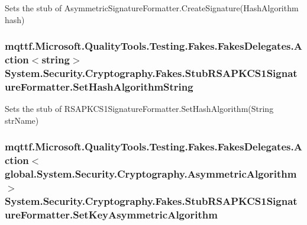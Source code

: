 Sets the stub of Asymmetric\-Signature\-Formatter.\-Create\-Signature(\-Hash\-Algorithm hash)

\hypertarget{class_system_1_1_security_1_1_cryptography_1_1_fakes_1_1_stub_r_s_a_p_k_c_s1_signature_formatter_a7e17f3c4cb25bad35778ced0bef583e9}{
\subsubsection[{Set\-Hash\-Algorithm\-String}]{\setlength{\rightskip}{0pt plus 5cm}mqttf.\-Microsoft.\-Quality\-Tools.\-Testing.\-Fakes.\-Fakes\-Delegates.\-Action$<$string$>$ System.\-Security.\-Cryptography.\-Fakes.\-Stub\-R\-S\-A\-P\-K\-C\-S1\-Signature\-Formatter.\-Set\-Hash\-Algorithm\-String}}\label{class_system_1_1_security_1_1_cryptography_1_1_fakes_1_1_stub_r_s_a_p_k_c_s1_signature_formatter_a7e17f3c4cb25bad35778ced0bef583e9}


Sets the stub of R\-S\-A\-P\-K\-C\-S1\-Signature\-Formatter.\-Set\-Hash\-Algorithm(\-String str\-Name)

\hypertarget{class_system_1_1_security_1_1_cryptography_1_1_fakes_1_1_stub_r_s_a_p_k_c_s1_signature_formatter_aa50462c44ae22c672b258d70e91be344}{
\subsubsection[{Set\-Key\-Asymmetric\-Algorithm}]{\setlength{\rightskip}{0pt plus 5cm}mqttf.\-Microsoft.\-Quality\-Tools.\-Testing.\-Fakes.\-Fakes\-Delegates.\-Action$<$global.\-System.\-Security.\-Cryptography.\-Asymmetric\-Algorithm$>$ System.\-Security.\-Cryptography.\-Fakes.\-Stub\-R\-S\-A\-P\-K\-C\-S1\-Signature\-Formatter.\-Set\-Key\-Asymmetric\-Algorithm}}\label{class_system_1_1_security_1_1_cryptography_1_1_fakes_1_1_stub_r_s_a_p_k_c_s1_signature_formatter_aa50462c44ae22c672b258d70e91be344}


